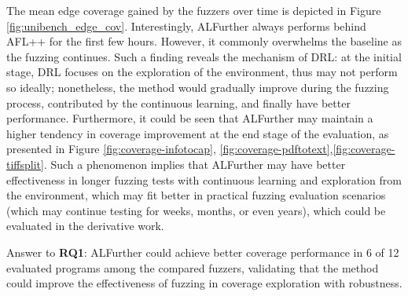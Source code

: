 \documentclass[lettersize,journal]{IEEEtran}
\begin{document}
The mean edge coverage gained by the fuzzers over time is depicted in Figure \ref{fig:unibench_edge_cov}. Interestingly, ALFurther always performs behind AFL++ for the first few hours. However, it commonly overwhelms the baseline as the fuzzing continues. Such a finding reveals the mechanism of DRL: at the initial stage, DRL focuses on the exploration of the environment, thus may not perform so ideally; nonetheless, the method would gradually improve during the fuzzing process, contributed by the continuous learning, and finally have better performance. Furthermore, it could be seen that ALFurther may maintain a higher tendency in coverage improvement at the end stage of the evaluation, as presented in Figure \ref{fig:coverage-infotocap}, \ref{fig:coverage-pdftotext},\ref{fig:coverage-tiffsplit}. Such a phenomenon implies that ALFurther may have better effectiveness in longer fuzzing tests with continuous learning and exploration from the environment, which may fit better in practical fuzzing evaluation scenarios (which may continue testing for weeks, months, or even years), which could be evaluated in the derivative work.

Answer to \textbf{RQ1}: ALFurther could achieve better coverage performance in 6 of 12 evaluated programs among the compared fuzzers, validating that the method could improve the effectiveness of fuzzing in coverage exploration with robustness.
\end{document}
